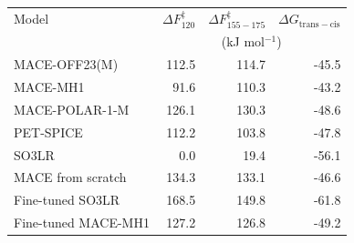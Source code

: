 \begin{tabular}{lrrr}
\hline
Model & $\Delta F^\ddagger_{120}$ & $\Delta F^\ddagger_{155-175}$ & $\Delta G_{\mathrm{trans-cis}}$ \\
 & \multicolumn{3}{c}{(kJ mol$^{-1}$)} \\
\hline
MACE-OFF23(M) & 112.5 & 114.7 & -45.5 \\
MACE-MH1 & 91.6 & 110.3 & -43.2 \\
MACE-POLAR-1-M & 126.1 & 130.3 & -48.6 \\
PET-SPICE & 112.2 & 103.8 & -47.8 \\
SO3LR & 0.0 & 19.4 & -56.1 \\
MACE from scratch & 134.3 & 133.1 & -46.6 \\
Fine-tuned SO3LR & 168.5 & 149.8 & -61.8 \\
Fine-tuned MACE-MH1 & 127.2 & 126.8 & -49.2 \\
\hline
\end{tabular}
